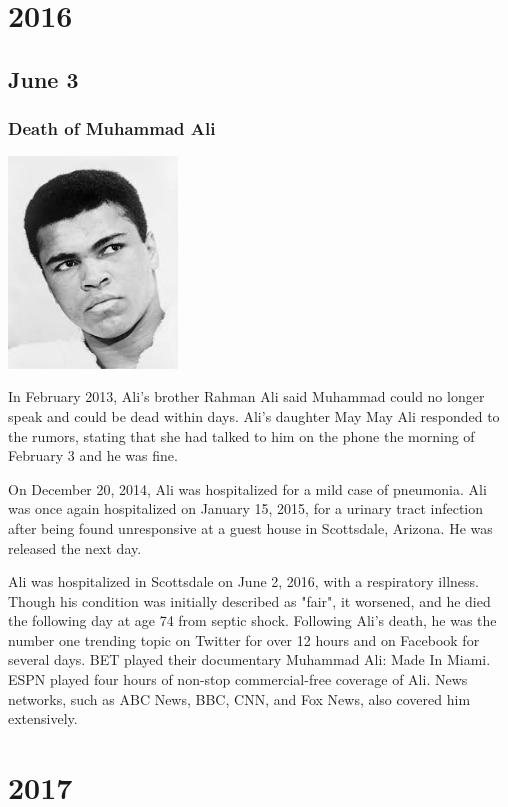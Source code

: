 \documentclass[11pt]{report}
\begin{document}
\chapter{2016}
\section{June 3}
\subsection{Death of Muhammad Ali}
\vspace{2mm}\begin{center}\includegraphics[width=4.5cm]{./img/muhammadAli.jpg}\end{center}
In February 2013, Ali's brother Rahman Ali said Muhammad could no longer speak and could be dead within days. Ali's daughter May May Ali responded to the rumors, stating that she had talked to him on the phone the morning of February 3 and he was fine.

On December 20, 2014, Ali was hospitalized for a mild case of pneumonia. Ali was once again hospitalized on January 15, 2015, for a urinary tract infection after being found unresponsive at a guest house in Scottsdale, Arizona. He was released the next day.

Ali was hospitalized in Scottsdale on June 2, 2016, with a respiratory illness. Though his condition was initially described as "fair", it worsened, and he died the following day at age 74 from septic shock. Following Ali's death, he was the number one trending topic on Twitter for over 12 hours and on Facebook for several days. BET played their documentary Muhammad Ali: Made In Miami. ESPN played four hours of non-stop commercial-free coverage of Ali. News networks, such as ABC News, BBC, CNN, and Fox News, also covered him extensively.

\chapter{2017}
\end{document}
